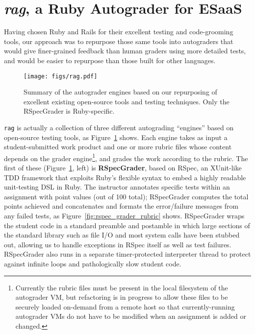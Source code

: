 \section{\emph{rag}, a Ruby Autograder for ESaaS}

Having chosen Ruby and Rails for their excellent testing and
code-grooming tools, our approach was to repurpose those same tools into
autograders that would give finer-grained feedback than human graders
using more detailed tests, and would be easier to repurpose than
those built for other languages.

\begin{figure}
  \centering
  \texttt{[image: figs/rag.pdf]}
  
  \caption{\label{fig:grader_summary} Summary of the autograder
    engines based on our repurposing of excellent existing open-source
    tools and testing techniques.  Only the RSpecGrader is
    Ruby-specific.}
\end{figure}

\texttt{rag} is actually a collection of
three different autograding ``engines'' based on open-source testing
tools, as Figure~\ref{fig:grader_summary} shows.
Each engine takes as input a student-submitted work product and one or
more rubric files whose content depends on the grader
engine\footnote{Currently the rubric files must be present in the local
filesystem of the autograder VM, but refactoring is in progress to
allow these files to be securely loaded on-demand from a remote host
so that currently-running autograder VMs do not have to be modified
when an assignment is added or changed.}, and grades the work
according to the rubric.
The first of these (Figure~\ref{fig:grader_summary}, left) is
\textbf{RSpecGrader}, based on RSpec, an XUnit-like TDD framework that
exploits Ruby's flexible syntax to embed a highly readable unit-testing
DSL in Ruby.
The instructor annotates specific tests within an assignment with point
values (out of 100 total); RSpecGrader computes the total points
achieved and concatenates and formats the error/failure messages from
any failed tests, as Figure~\ref{fig:rspec_grader_rubric} shows.
RSpecGrader wraps the student code in a standard preamble and postamble
in which large sections of the standard library such as file I/O and
most system calls have been stubbed out, allowing us to handle
exceptions in RSpec itself as well as test failures.
RSpecGrader also runs in a separate timer-protected interpreter thread
to protect against infinite loops and pathologically slow student code.

